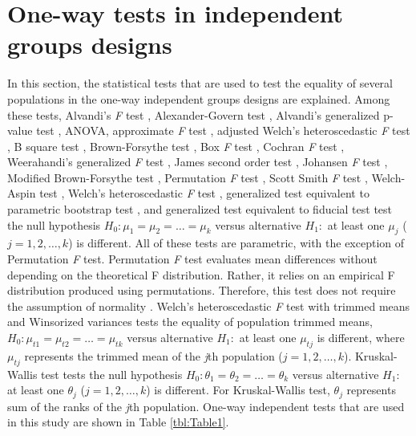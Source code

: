 \section{One-way tests in independent groups designs}\label{method}
In this section, the statistical tests that are used to test the equality of several populations in the one-way independent groups designs are explained. Among these tests, Alvandi's \textit{F} test \citep{sadooghi2012}, Alexander-Govern test \citep{alexander1994}, Alvandi's generalized p-value test \citep{sadooghi2012}, ANOVA, approximate \textit{F} test \citep{asiribo1990coping}, adjusted Welch's heteroscedastic \textit{F} test \citep{WELCH:1951}, B square test \citep{ozdemir2006one}, Brown-Forsythe test \citep{brown1974a, brown1974b}, Box \textit{F} test \citep{lix1998trim}, Cochran \textit{F} test \citep{cochran1937}, Weerahandi’s generalized \textit{F} test \citep{weerahandi1995}, James second order test \citep{JAMES:1951, JAMES:1954}, Johansen \textit{F} test \citep{johansen1980welch}, Modified Brown-Forsythe test \citep{mehrotra1997improving}, Permutation \textit{F} test \citep{berry2002fisher}, Scott Smith \textit{F} test \citep{scott1971interval}, Welch-Aspin test \citep{aspin1948}, Welch's heteroscedastic \textit{F} test \citep{WELCH:1951}, generalized test equivalent to parametric bootstrap test \citep{weerahandi2019}, and generalized test equivalent to fiducial test \citep{weerahandi2019} test the null hypothesis $H_0: \mu_1=\mu_2= \ldots =\mu_k$ versus alternative $H_1:$ at least one $\mu_j$ ($j=1,2,\ldots, k$) is different.
All of these tests are parametric, with the exception of Permutation \textit{F} test. Permutation \textit{F} test evaluates mean differences without depending on the theoretical F distribution. Rather, it relies on an empirical F distribution produced using permutations. Therefore, this test does not require the assumption of normality \citep{winkler2014}.
Welch's heteroscedastic \textit{F} test with trimmed means and Winsorized variances \citep{WELCH:1951} tests the equality of population trimmed means, $H_0: \mu_{t1}=\mu_{t2}= \ldots =\mu_{tk}$ versus alternative $H_1:$ at least one $\mu_{tj}$ is different, where $\mu_{tj}$ represents the trimmed mean of the \textit{j}th population ($j=1,2,\ldots, k$). Kruskal-Wallis test \citep{kruskal1952} tests the null hypothesis $H_0: \theta_1=\theta_2= \ldots =\theta_k$ versus alternative $H_1:$ at least one $\theta_j$ ($j=1,2,\ldots, k$) is different. For Kruskal-Wallis test, $\theta_j$ represents sum of the ranks of the \textit{j}th population.
One-way independent tests that are used in this study are shown in Table \ref{tbl:Table1}.  

